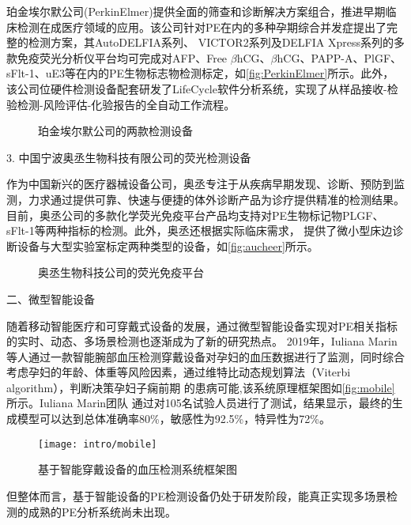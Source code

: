 珀金埃尔默公司(PerkinElmer)提供全面的筛查和诊断解决方案组合，推进早期临床检测在成医疗领域的应用。该公司针对PE在内的多种孕期综合并发症提出了完整的检测方案，其AutoDELFIA系列、
VICTOR2系列及DELFIA Xpress系列的多款免疫荧光分析仪平台\cite{perkinelmer2021}均可完成对AFP、Free $\beta$hCG、$\beta$hCG、PAPP-A、PlGF、
sFlt-1、uE3等在内的PE生物标志物检测标定，如\autoref{fig:PerkinElmer}所示。此外，该公司位硬件检测设备配套研发了LifeCycle软件分析系统，实现了从样品接收-检验检测-风险评估-化验报告的全自动工作流程。
\begin{figure}[h]
    \centering
    \quad
    \caption{\label{fig:PerkinElmer}珀金埃尔默公司的两款检测设备}
\end{figure}

3. 中国宁波奥丞生物科技有限公司的荧光检测设备

作为中国新兴的医疗器械设备公司，奥丞专注于从疾病早期发现、诊断、预防到监测，力求通过提供可靠、快速与便捷的体外诊断产品为诊疗提供精准的检测结果。
目前，奥丞公司的多款化学荧光免疫平台产品均支持对PE生物标记物PLGF、sFlt-1等两种指标的检测\cite{aucheer2021}。此外，奥丞还根据实际临床需求，
提供了微小型床边诊断设备与大型实验室标定两种类型的设备，如\autoref{fig:aucheer}所示。
\begin{figure}[h]
    \centering
    \quad
    \caption{\label{fig:aucheer}奥丞生物科技公司的荧光免疫平台}
\end{figure}


二、微型智能设备

随着移动智能医疗和可穿戴式设备的发展，通过微型智能设备实现对PE相关指标的实时、动态、多场景检测也逐渐成为了新的研究热点。
2019年，Iuliana Marin等人\cite{Marin2019,Marin2020}通过一款智能腕部血压检测穿戴设备对孕妇的血压数据进行了监测，同时综合考虑孕妇的年龄、体重等风险因素，通过维特比动态规划算法（Viterbi algorithm），判断决策孕妇子痫前期
的患病可能,该系统原理框架图如\autoref{fig:mobile}所示。Iuliana Marin团队
通过对105名试验人员进行了测试，结果显示，最终的生成模型可以达到总体准确率80\%，敏感性为92.5\%，特异性为72\%\cite{Marin2019}。
\begin{figure}[htbp]
    \centering
    \texttt{[image: intro/mobile]}
    \caption[基于智能穿戴设备的血压检测系统框架图]{\label{fig:mobile}基于智能穿戴设备的血压检测系统框架图\cite{Marin2019,Marin2020}}
\end{figure}
但整体而言，基于智能设备的PE检测设备仍处于研发阶段，能真正实现多场景检测的成熟的PE分析系统尚未出现。

